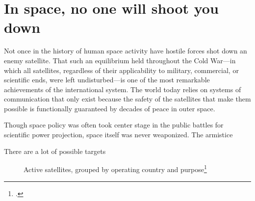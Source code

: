 \documentclass{report}
\begin{document}
\section{In space, no one will shoot you down}
Not once in the history of human space activity have hostile forces shot down an enemy satellite. That such an equilibrium held throughout the Cold War---in which all satellites, regardless of their applicability to military, commercial, or scientific ends, were left undisturbed---is one of the most remarkable achievements of the international system. The world today relies on systems of communication that only exist because the safety of the satellites that make them possible is functionally guaranteed by decades of peace in outer space.


Though space policy was often took center stage in the public battles for scientific power projection, space itself was never weaponized. The armistice

There are a lot of possible targets


\begin{figure}[ht]
  \centering
  
  \label{country_sats}
  \caption{Active satellites, grouped by operating country and purpose\footcite[A few satellites are listed as dual-purpose (i.e. Government/Military), and those are counted twice, once for each purpose. For instance, the data shows that the US is currently operating 830 satellites, while adding up the bars in this chart would give you 966. I made this choice to emphasize the dependency of various social systems on the existing satellite infrastructure.]{union_of_concerned_scientists_ucs_2018}}
\end{figure}
\end{document}

